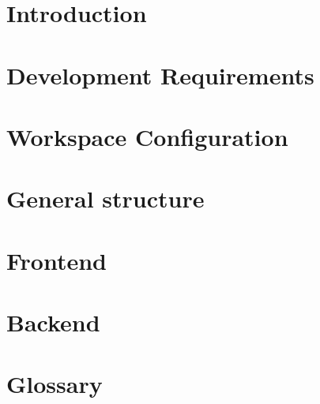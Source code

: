\documentclass[a4paper, oneside, openany, dvipsnames, table]{article}
\begin{document}
\copertina{}
\newpage

\newpage
\tableofcontents
\newpage
\listoffigures
\newpage
\listoftables

\newpage
\newpage
\section{Introduction}
	

\newpage
\section{Development Requirements}


\newpage
\section{Workspace Configuration}



\section{General structure}


\newpage
\section{Frontend} %



\newpage
\section{Backend}


\newpage

\appendix
{}

\newpage
\section{Glossary}

\end{document}
